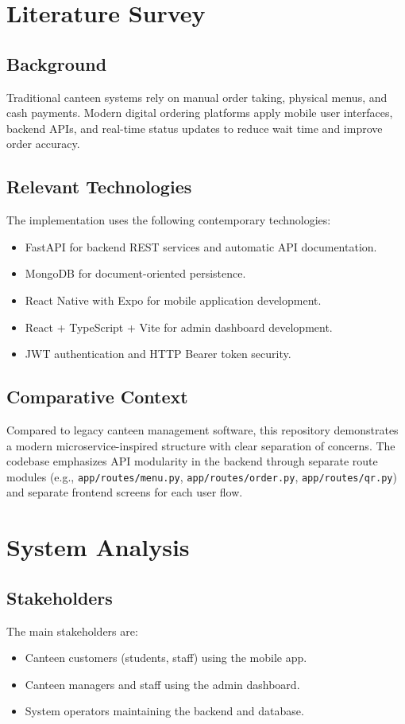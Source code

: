 \documentclass[12pt,a4paper]{report}
\begin{document}
\chapter{Literature Survey}
\section{Background}
Traditional canteen systems rely on manual order taking, physical menus, and cash payments. Modern digital ordering platforms apply mobile user interfaces, backend APIs, and real-time status updates to reduce wait time and improve order accuracy.

\section{Relevant Technologies}
The implementation uses the following contemporary technologies:
\begin{itemize}
  \item FastAPI for backend REST services and automatic API documentation.
  \item MongoDB for document-oriented persistence.
  \item React Native with Expo for mobile application development.
  \item React + TypeScript + Vite for admin dashboard development.
  \item JWT authentication and HTTP Bearer token security.
\end{itemize}

\section{Comparative Context}
Compared to legacy canteen management software, this repository demonstrates a modern microservice-inspired structure with clear separation of concerns. The codebase emphasizes API modularity in the backend through separate route modules (e.g., \texttt{app/routes/menu.py}, \texttt{app/routes/order.py}, \texttt{app/routes/qr.py}) and separate frontend screens for each user flow.

\chapter{System Analysis}
\section{Stakeholders}
The main stakeholders are:
\begin{itemize}
  \item Canteen customers (students, staff) using the mobile app.
  \item Canteen managers and staff using the admin dashboard.
  \item System operators maintaining the backend and database.
\end{itemize}
\end{document}
